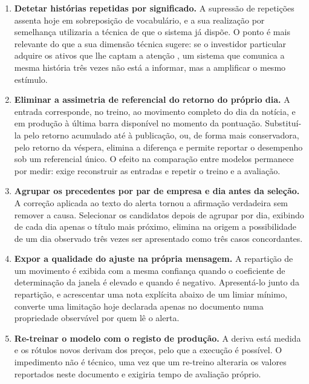 \begin{enumerate}
  \item \textbf{Detetar histórias repetidas por significado.} A supressão de repetições assenta hoje
        em sobreposição de vocabulário, e a sua realização por semelhança utilizaria a técnica de que
        o sistema já dispõe. O ponto é mais relevante do que a sua dimensão técnica sugere: se o
        investidor particular adquire os ativos que lhe captam a atenção
        \autocite{barber2008glitters}, um sistema que comunica a mesma história três vezes não está a
        informar, mas a amplificar o mesmo estímulo.

  \item \textbf{Eliminar a assimetria de referencial do retorno do próprio dia.} A entrada
        corresponde, no treino, ao movimento completo do dia da notícia, e em produção à última
        barra disponível no momento da pontuação. Substituí-la pelo retorno acumulado até à
        publicação, ou, de forma mais conservadora, pelo retorno da véspera, elimina a diferença e
        permite reportar o desempenho sob um referencial único. O efeito na comparação entre
        modelos permanece por medir: exige reconstruir as entradas e repetir o treino e a avaliação.

  \item \textbf{Agrupar os precedentes por par de empresa e dia antes da seleção.} A correção
        aplicada ao texto do alerta tornou a afirmação verdadeira sem remover a causa. Selecionar os
        candidatos depois de agrupar por dia, exibindo de cada dia apenas o título mais próximo,
        elimina na origem a possibilidade de um dia observado três vezes ser apresentado como três
        casos concordantes.

  \item \textbf{Expor a qualidade do ajuste na própria mensagem.} A repartição de um movimento é
        exibida com a mesma confiança quando o coeficiente de determinação da janela é elevado e
        quando é negativo. Apresentá-lo junto da repartição, e acrescentar uma nota explícita abaixo
        de um limiar mínimo, converte uma limitação hoje declarada apenas no documento numa
        propriedade observável por quem lê o alerta.

  \item \textbf{Re-treinar o modelo com o registo de produção.} A deriva está medida e os rótulos
        novos derivam dos preços, pelo que a execução é possível. O impedimento não é técnico, uma
        vez que um re-treino alteraria os valores reportados neste documento e exigiria tempo de
        avaliação próprio.
\end{enumerate}

